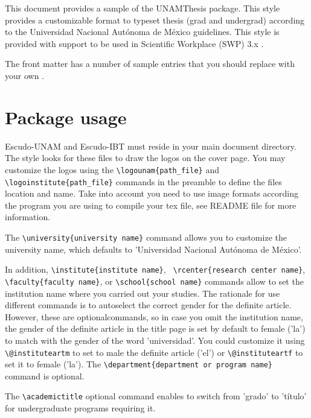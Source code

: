 \documentclass[11pt,spanish]{report}
\begin{document}
This document provides a sample of the UNAMThesis package. This style provides a
customizable format to typeset thesis (grad and undergrad) according to the Universidad
Nacional Aut\'{o}noma de M\'{e}xico guidelines. This style is provided with support to be
used in Scientific Workplace (SWP) 3.x \citep{Barabasi2002,Freyre-Gonzalez2008,
Freyre-Gonzalez2005}.

The front matter has a number of sample entries that you should replace with
your own \citep{Gottesman1984,Griffith2002,Hartwell1999}.

\section{Package usage}
Escudo-UNAM and Escudo-IBT must reside in your main document directory. The style looks
for these files to draw the logos on the cover page. You may customize the logos using
the \texttt{\textbackslash{}logounam\{path\_file\}} and
\texttt{\textbackslash{}logoinstitute\{path\_file\}} commands in the preamble to define
the files location and name. Take into account you need to use image formats according
the program you are using to compile your tex file, see README file for more information.

The \texttt{\textbackslash{}university\{university name\}} command allows you to customize
the university name, which defaults to 'Universidad Nacional Aut\'{o}noma de M\'{e}xico'.

In addition, \texttt{\textbackslash{}institute\{institute name\}}, \texttt{
\textbackslash{}rcenter\{research center name\}},
\texttt{\textbackslash{}faculty\{faculty name\}}, or
\texttt{\textbackslash{}school\{school name\}} commands allow to set the institution name
where you carried out your studies. The rationale for use different commands is to
autoselect the correct gender for the definite article. However, these are optionalcommands,
so in case you omit the institution name, the gender of the definite article in the title
page is set by default to female ('la') to match with the gender of the word 'universidad'.
You could customize it using \texttt{\textbackslash{}@instituteartm} to set to male the
definite article ('el') or \texttt{\textbackslash{}@instituteartf} to set it to female
('la'). The \texttt{\textbackslash{}department\{department or program name\}} command is
optional.

The \texttt{\textbackslash{}academictitle} optional command enables to switch from 'grado'
to 't\'{i}tulo' for undergraduate programs requiring it.
\end{document}
